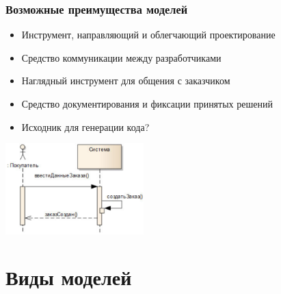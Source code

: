 \documentclass{../mcsslides}
\begin{document}
    \begin{frame}
        \frametitle{Возможные преимущества моделей}
        \begin{itemize}
            \item Инструмент, направляющий и облегчающий проектирование
            \item Средство коммуникации между разработчиками
            \item Наглядный инструмент для общения с заказчиком
            \item Средство документирования и фиксации принятых решений
            \item Исходник для генерации кода?
        \end{itemize}
        \begin{center}
            \includegraphics[width=0.4\textwidth]{sequenceDiagram.png}
        \end{center}
    \end{frame}

    \section{Виды моделей}
\end{document}
